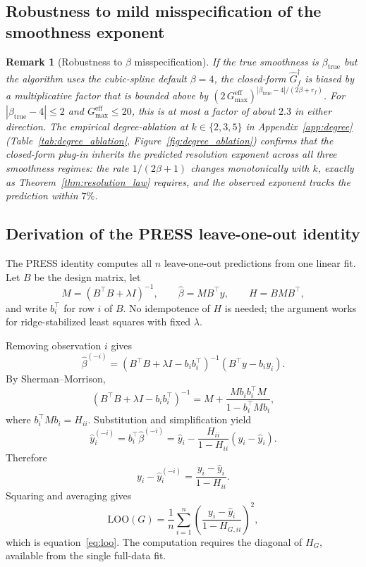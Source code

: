 \documentclass{article}
\newtheorem{remark}{Remark}
\begin{document}
\subsection{Robustness to mild misspecification of the smoothness exponent}
\label{app:beta_misspec}

\begin{remark}[Robustness to $\beta$ misspecification]
\label{rem:beta_misspec}
If the true smoothness is $\beta_{\mathrm{true}}$ but the algorithm uses the cubic-spline default $\beta = 4$, the closed-form $\widehat G_f^\dagger$ is biased by a multiplicative factor that is bounded above by $(2\,G_{\max}^{\mathrm{eff}})^{|\beta_{\mathrm{true}} - 4| / (2\beta + r_f)}$. For $|\beta_{\mathrm{true}} - 4| \le 2$ and $G_{\max}^{\mathrm{eff}} \le 20$, this is at most a factor of about $2.3$ in either direction. The empirical degree-ablation at $k \in \{2, 3, 5\}$ in Appendix~\ref{app:degree} (Table~\ref{tab:degree_ablation}, Figure~\ref{fig:degree_ablation}) confirms that the closed-form plug-in inherits the predicted resolution exponent across all three smoothness regimes: the rate $1/(2\beta+1)$ changes monotonically with $k$, exactly as Theorem~\ref{thm:resolution_law} requires, and the observed exponent tracks the prediction within $7\%$.
\end{remark}

\subsection{Derivation of the PRESS leave-one-out identity}
\label{app:loo}

The PRESS identity \citep{allen1974} computes all $n$ leave-one-out predictions from one linear fit. Let $B$ be the design matrix, let
\[
M=(B^\top B+\lambda I)^{-1},
\qquad
\hat\beta=M B^\top y,
\qquad
H=BMB^\top,
\]
and write $b_i^\top$ for row $i$ of $B$. No idempotence of $H$ is needed; the argument works for ridge-stabilized least squares with fixed $\lambda$.

Removing observation $i$ gives
\[
\hat\beta^{(-i)}=(B^\top B+\lambda I-b_i b_i^\top)^{-1}(B^\top y-b_i y_i).
\]
By Sherman--Morrison,
\[
(B^\top B+\lambda I-b_i b_i^\top)^{-1}
=M+\frac{M b_i b_i^\top M}{1-b_i^\top M b_i},
\]
where $b_i^\top M b_i=H_{ii}$. Substitution and simplification yield
\[
\hat y_i^{(-i)}=b_i^\top\hat\beta^{(-i)}
=\hat y_i-\frac{H_{ii}}{1-H_{ii}}(y_i-\hat y_i).
\]
Therefore
\[
 y_i-\hat y_i^{(-i)}=\frac{y_i-\hat y_i}{1-H_{ii}}.
\]
Squaring and averaging gives
\[
\mathrm{LOO}(G)=\frac{1}{n}\sum_{i=1}^n\left(\frac{y_i-\hat y_i}{1-H_{G,ii}}\right)^2,
\]
which is equation~\eqref{eq:loo}. The computation requires the diagonal of $H_G$, available from the single full-data fit.
\end{document}

